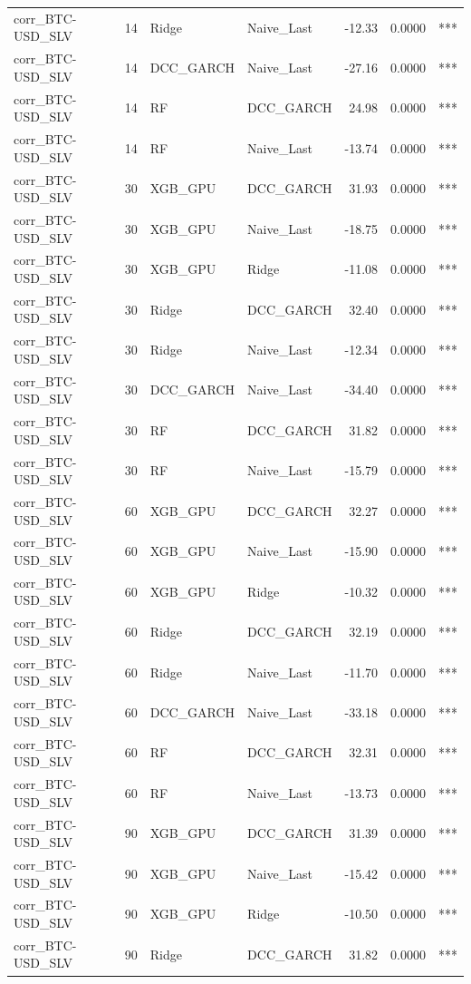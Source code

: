 \begin{table}[H]
\begin{tabular}{llllrrl}
corr_BTC-USD_SLV & 14 & Ridge & Naive_Last & -12.33 & 0.0000 & *** \\
corr_BTC-USD_SLV & 14 & DCC_GARCH & Naive_Last & -27.16 & 0.0000 & *** \\
corr_BTC-USD_SLV & 14 & RF & DCC_GARCH & 24.98 & 0.0000 & *** \\
corr_BTC-USD_SLV & 14 & RF & Naive_Last & -13.74 & 0.0000 & *** \\
corr_BTC-USD_SLV & 30 & XGB_GPU & DCC_GARCH & 31.93 & 0.0000 & *** \\
corr_BTC-USD_SLV & 30 & XGB_GPU & Naive_Last & -18.75 & 0.0000 & *** \\
corr_BTC-USD_SLV & 30 & XGB_GPU & Ridge & -11.08 & 0.0000 & *** \\
corr_BTC-USD_SLV & 30 & Ridge & DCC_GARCH & 32.40 & 0.0000 & *** \\
corr_BTC-USD_SLV & 30 & Ridge & Naive_Last & -12.34 & 0.0000 & *** \\
corr_BTC-USD_SLV & 30 & DCC_GARCH & Naive_Last & -34.40 & 0.0000 & *** \\
corr_BTC-USD_SLV & 30 & RF & DCC_GARCH & 31.82 & 0.0000 & *** \\
corr_BTC-USD_SLV & 30 & RF & Naive_Last & -15.79 & 0.0000 & *** \\
corr_BTC-USD_SLV & 60 & XGB_GPU & DCC_GARCH & 32.27 & 0.0000 & *** \\
corr_BTC-USD_SLV & 60 & XGB_GPU & Naive_Last & -15.90 & 0.0000 & *** \\
corr_BTC-USD_SLV & 60 & XGB_GPU & Ridge & -10.32 & 0.0000 & *** \\
corr_BTC-USD_SLV & 60 & Ridge & DCC_GARCH & 32.19 & 0.0000 & *** \\
corr_BTC-USD_SLV & 60 & Ridge & Naive_Last & -11.70 & 0.0000 & *** \\
corr_BTC-USD_SLV & 60 & DCC_GARCH & Naive_Last & -33.18 & 0.0000 & *** \\
corr_BTC-USD_SLV & 60 & RF & DCC_GARCH & 32.31 & 0.0000 & *** \\
corr_BTC-USD_SLV & 60 & RF & Naive_Last & -13.73 & 0.0000 & *** \\
corr_BTC-USD_SLV & 90 & XGB_GPU & DCC_GARCH & 31.39 & 0.0000 & *** \\
corr_BTC-USD_SLV & 90 & XGB_GPU & Naive_Last & -15.42 & 0.0000 & *** \\
corr_BTC-USD_SLV & 90 & XGB_GPU & Ridge & -10.50 & 0.0000 & *** \\
corr_BTC-USD_SLV & 90 & Ridge & DCC_GARCH & 31.82 & 0.0000 & *** \\

\end{tabular}
\end{table}
